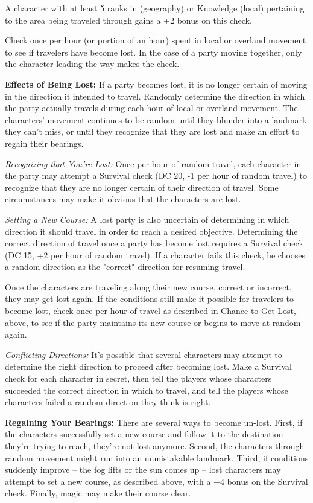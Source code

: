 A character with at least 5 ranks in  (geography) or Knowledge (local) 
pertaining to the area being traveled through gains a +2 bonus on this check.

Check once per hour (or portion of an hour) spent in local or overland movement 
to see if travelers have become lost. In the case of a party moving together, only 
the character leading the way makes the check.

\textbf{Effects of Being Lost:} If a party becomes lost, it is no longer certain 
of moving in the direction it intended to travel. Randomly determine the direction 
in which the party actually travels during each hour of local or overland movement. 
The characters' movement continues to be random until they blunder into a landmark 
they can't miss, or until they recognize that they are lost and make an effort 
to regain their bearings.

\textit{Recognizing that You're Lost:} Once per hour of random travel, each character 
in the party may attempt a Survival check (DC 20, -1 per hour of random travel) 
to recognize that they are no longer certain of their direction of travel. Some 
circumstances may make it obvious that the characters are lost.

\textit{Setting a New Course:} A lost party is also uncertain of determining in 
which direction it should travel in order to reach a desired objective. Determining 
the correct direction of travel once a party has become lost requires a Survival 
check (DC 15, +2 per hour of random travel). If a character fails this check, he 
chooses a random direction as the "correct" direction for resuming travel.

Once the characters are traveling along their new course, correct or incorrect, 
they may get lost again. If the conditions still make it possible for travelers 
to become lost, check once per hour of travel as described in Chance to Get Lost, 
above, to see if the party maintains its new course or begins to move at random 
again.

\textit{Conflicting Directions:} It's possible that several characters may attempt 
to determine the right direction to proceed after becoming lost. Make a Survival 
check for each character in secret, then tell the players whose characters succeeded 
the correct direction in which to travel, and tell the players whose characters 
failed a random direction they think is right. 

\textbf{Regaining Your Bearings:} There are several ways to become un-lost. First, 
if the characters successfully set a new course and follow it to the destination 
they're trying to reach, they're not lost anymore. Second, the characters through 
random movement might run into an unmistakable landmark. Third, if conditions suddenly 
improve -- the fog lifts or the sun comes up -- lost characters may attempt to set 
a new course, as described above, with a +4 bonus on the Survival check. Finally, 
magic may make their course clear.


